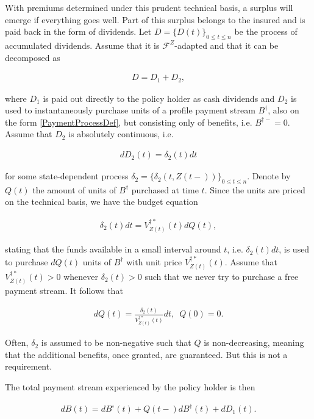 \documentclass{article}
\newcommand{\1}[1]{\mathbbm{1}_{\left\lbrace #1 \right\rbrace}}
\theoremstyle{break}
\theoremstyle{remark}
\newenvironment{remark}
  {\pushQED{\qed}\renewcommand{\qedsymbol}{\scalebox{1.4}{$\circ$}}\remarkx}
  {\popQED\endremarkx}
\numberwithin{equation}{section}
\begin{document}
With premiums determined under this prudent technical basis, a surplus will emerge if everything goes well. Part of this surplus belongs to the insured and is paid back in the form of dividends. Let $D = \{ D(t) \}_{0 \leq t \leq n}$ be the process of accumulated dividends. Assume that it is $\mathcal{F}^{Z}$-adapted and that it can be decomposed as

\begin{align*}
D = D_1 + D_2,
\end{align*}

where $D_1$ is paid out directly to the policy holder as cash dividends and $D_2$ is used to instantaneously purchase units of a profile payment stream $B^\dagger$, also on the form \ref{PaymentProcessDef}, but consisting only of benefits, i.e. $B^{\dagger -}=0$. Assume that $D_2$ is absolutely continuous, i.e.

\begin{align*}
dD_2(t) = \delta_2(t) dt
\end{align*}

for some state-dependent process $\delta_2 = \{ \delta_2(t,Z(t-)) \}_{0 \leq t \leq n}$. Denote by $Q(t)$ the amount of units of $B^\dagger$ purchased at time $t$. Since the units are priced on the technical basis, we have the budget equation

\begin{align*}
\delta_2(t) dt = V_{Z(t)}^{\dagger*}(t) dQ(t),
\end{align*}

stating that the funds available in a small interval around $t$, i.e. $\delta_2(t) dt$, is used to purchase $dQ(t)$ units of $B^\dagger$ with unit price $V_{Z(t)}^{\dagger*}(t)$. Assume that $V_{Z(t)}^{\dagger*}(t)>0$ whenever $\delta_2(t)>0$ such that we never try to purchase a free payment stream. It follows that

\begin{align} \label{QDynamics}
dQ(t) = \frac{\delta_2(t)}{V_{Z(t)}^{\dagger*}(t)}  dt, \, \, \, Q(0)=0.
\end{align}

\begin{remark}
	Often, $\delta_2$ is assumed to be non-negative such that $Q$ is non-decreasing, meaning that the additional benefits, once granted, are guaranteed. But this is not a requirement.
\end{remark}

The total payment stream experienced by the policy holder is then

\begin{align} \label{WithProfitTotalBenefits}
dB(t) = dB^\circ(t) + Q(t-) dB^\dagger(t) + dD_1(t).
\end{align}
\end{document}
